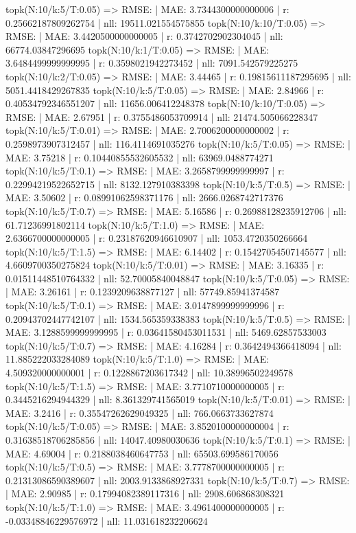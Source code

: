 topk(N:10/k:5/T:0.05) => RMSE: | MAE: 3.7344300000000006 | r: 0.25662187809262754 | nll: 19511.021554575855
topk(N:10/k:10/T:0.05) => RMSE: | MAE: 3.4420500000000005 | r: 0.3742702902304045 | nll: 66774.03847296695
topk(N:10/k:1/T:0.05) => RMSE: | MAE: 3.6484499999999995 | r: 0.3598021942273452 | nll: 7091.542579225275
topk(N:10/k:2/T:0.05) => RMSE: | MAE: 3.44465 | r: 0.19815611187295695 | nll: 5051.4418429267835
topk(N:10/k:5/T:0.05) => RMSE: | MAE: 2.84966 | r: 0.40534792346551207 | nll: 11656.006412248378
topk(N:10/k:10/T:0.05) => RMSE: | MAE: 2.67951 | r: 0.3755486053709914 | nll: 21474.505066228347
topk(N:10/k:5/T:0.01) => RMSE: | MAE: 2.7006200000000002 | r: 0.2598973907312457 | nll: 116.4114691035276
topk(N:10/k:5/T:0.05) => RMSE: | MAE: 3.75218 | r: 0.10440855532605532 | nll: 63969.0488774271
topk(N:10/k:5/T:0.1) => RMSE: | MAE: 3.2658799999999997 | r: 0.22994219522652715 | nll: 8132.127910383398
topk(N:10/k:5/T:0.5) => RMSE: | MAE: 3.50602 | r: 0.08991062598371176 | nll: 2666.0268742717376
topk(N:10/k:5/T:0.7) => RMSE: | MAE: 5.16586 | r: 0.26988128235912706 | nll: 61.71236991802114
topk(N:10/k:5/T:1.0) => RMSE: | MAE: 2.6366700000000005 | r: 0.23187620946610907 | nll: 1053.4720350266664
topk(N:10/k:5/T:1.5) => RMSE: | MAE: 6.14402 | r: 0.15427054507145577 | nll: 4.6609700350275824
topk(N:10/k:5/T:0.01) => RMSE: | MAE: 3.16335 | r: 0.01511448510764332 | nll: 52.70005840048847
topk(N:10/k:5/T:0.05) => RMSE: | MAE: 3.26161 | r: 0.1239209638877127 | nll: 57749.85941374587
topk(N:10/k:5/T:0.1) => RMSE: | MAE: 3.0147899999999996 | r: 0.20943702447742107 | nll: 1534.565359338383
topk(N:10/k:5/T:0.5) => RMSE: | MAE: 3.1288599999999995 | r: 0.03641580453011531 | nll: 5469.62857533003
topk(N:10/k:5/T:0.7) => RMSE: | MAE: 4.16284 | r: 0.3642494366418094 | nll: 11.885222033284089
topk(N:10/k:5/T:1.0) => RMSE: | MAE: 4.509320000000001 | r: 0.1228867203617342 | nll: 10.38996502249578
topk(N:10/k:5/T:1.5) => RMSE: | MAE: 3.7710710000000005 | r: 0.3445216294944329 | nll: 8.361329741565019
topk(N:10/k:5/T:0.01) => RMSE: | MAE: 3.2416 | r: 0.35547262629049325 | nll: 766.0663733627874
topk(N:10/k:5/T:0.05) => RMSE: | MAE: 3.8520100000000004 | r: 0.31638518706285856 | nll: 14047.40980030636
topk(N:10/k:5/T:0.1) => RMSE: | MAE: 4.69004 | r: 0.2188038460647753 | nll: 65503.699586170056
topk(N:10/k:5/T:0.5) => RMSE: | MAE: 3.7778700000000005 | r: 0.21313086590389607 | nll: 2003.9133868927331
topk(N:10/k:5/T:0.7) => RMSE: | MAE: 2.90985 | r: 0.17994082389117316 | nll: 2908.606868308321
topk(N:10/k:5/T:1.0) => RMSE: | MAE: 3.4961400000000005 | r: -0.03348846229576972 | nll: 11.031618232206624
